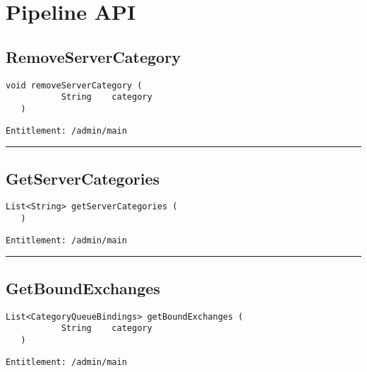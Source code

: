 \chapter{Pipeline API}

\section{RemoveServerCategory}
\label{Api:RemoveServerCategory}
\begin{lstlisting}[style=nonumbers]
   void removeServerCategory (
           String    category
   )
\end{lstlisting}
\begin{Verbatim}[formatcom=\color{Maroon}]
  Entitlement: /admin/main
\end{Verbatim}



\rule{12cm}{2pt}
\section{GetServerCategories}
\label{Api:GetServerCategories}
\begin{lstlisting}[style=nonumbers]
   List<String> getServerCategories (
   )
\end{lstlisting}
\begin{Verbatim}[formatcom=\color{Maroon}]
  Entitlement: /admin/main
\end{Verbatim}



\rule{12cm}{2pt}
\section{GetBoundExchanges}
\label{Api:GetBoundExchanges}
\begin{lstlisting}[style=nonumbers]
   List<CategoryQueueBindings> getBoundExchanges (
           String    category
   )
\end{lstlisting}
\begin{Verbatim}[formatcom=\color{Maroon}]
  Entitlement: /admin/main
\end{Verbatim}



